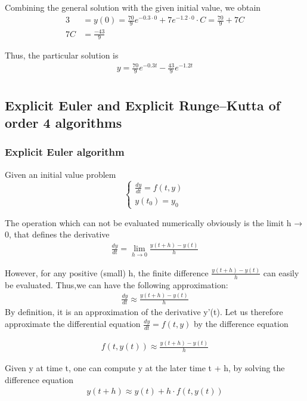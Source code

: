 \documentclass[a4paper]{article}
\numberwithin{equation}{section}
\begin{document}
Combining the general solution with the given initial value, we obtain
\begin{align*}
  3 & = y(0) = \frac{70}{9}e^{-0.3\cdot 0}+7e^{-1.2\cdot 0}\cdot C =\frac{70}{9}+7C \\
  7C & = \frac{-43}{9}
\end{align*}

Thus, the particular solution is
\begin{align*}
   y = \frac{70}{9}e^{-0.3t}-\frac{43}{9}e^{-1.2t}\\
\end{align*}



\subsection{Explicit Euler and Explicit Runge–Kutta of order 4 algorithms}
\subsubsection{Explicit Euler algorithm} \label{sssec:explicit_euler}
Given an initial value problem
\begin{equation*}
  \begin{cases}
    \frac{dy}{dt} = f(t,y) \\
    y(t_0) = y_0
  \end{cases}
\end{equation*}


The operation which can not be evaluated numerically obviously is the limit h → 0, that defines the derivative
\begin{align*}
  \frac{dy}{dt} = \lim_{h \rightarrow 0} \frac{y(t + h) - y(t)}{h}
\end{align*}

However, for any positive (small) h, the finite difference \(\frac{y(t + h) - y(t)}{h}\) can easily be evaluated. Thus,we can have the following approximation:
\begin{align*}
  \frac{dy}{dt} \approx \frac{y(t + h) - y(t)}{h}
\end{align*}
By definition, it is an approximation of the derivative
y'(t). Let us therefore approximate the differential equation \(\frac{dy}{dt} = f(t,y)\) by the difference equation

\begin{align*}
  f(t,y(t)) \approx  \frac{y(t + h) - y(t)}{h} 
\end{align*}

Given y at time t, one can compute y at the later time t + h, by solving the difference equation
\begin{align*}
  y(t + h) \approx y(t) + h \cdot f(t,y(t))
\end{align*}
\end{document}
